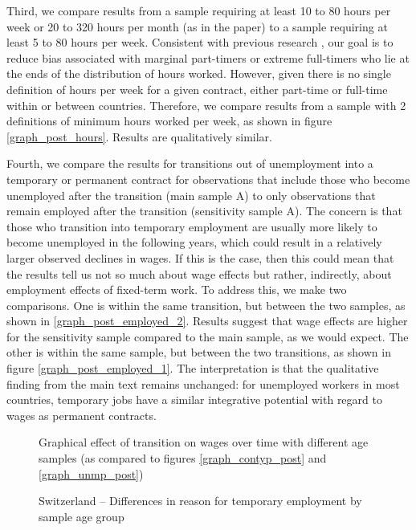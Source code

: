 Third, we compare results from a sample requiring at least 10 to 80 hours per week or 20 to 320 hours per month (as in the paper) to a sample requiring at least 5 to 80 hours per week.  Consistent with previous research \citep{barbieri_dual_2018}, our goal is to reduce bias associated with marginal part-timers or extreme full-timers who lie at the ends of the distribution of hours worked.  However, given there is no single definition of hours per week for a given contract, either part-time or full-time within or between countries.  Therefore, we compare results from a sample with 2 definitions of minimum hours worked per week, as shown in figure \ref{graph_post_hours}.  Results are qualitatively similar. 

Fourth, we compare the results for transitions out of unemployment into a temporary or permanent contract for observations that include those who become unemployed after the transition (main sample A) to only observations that remain employed after the transition (sensitivity sample A).  The concern is that those who transition into temporary employment are usually more likely to become unemployed in the following years, which could result in a relatively larger observed declines in wages. If this is the case, then this could mean that the results tell us not so much about wage effects but rather, indirectly, about employment effects of fixed-term work. To address this, we make two comparisons.  One is within the same transition, but between the two samples, as shown in \ref{graph_post_employed_2}.  Results suggest that wage effects are higher for the sensitivity sample compared to the main sample, as we would expect.  The other is within the same sample, but between the two transitions, as shown in figure \ref{graph_post_employed_1}.  The interpretation is that the qualitative finding from the main text remains unchanged: for unemployed workers in most countries, temporary jobs have a similar integrative potential with regard to wages as permanent contracts.  

\begin{sidewaysfigure}
    \caption{Graphical effect of transition on wages over time with different age samples (as compared to figures \ref{graph_contyp_post} and  \ref{graph_unmp_post})}
    \label{graph_post_age_16_64}
\end{sidewaysfigure}

\begin{sidewaysfigure}[h!]
    \caption{Switzerland -- Differences in reason for temporary employment by sample age group}
    \label{graph_ch_compare_sample_age}
\end{sidewaysfigure}

